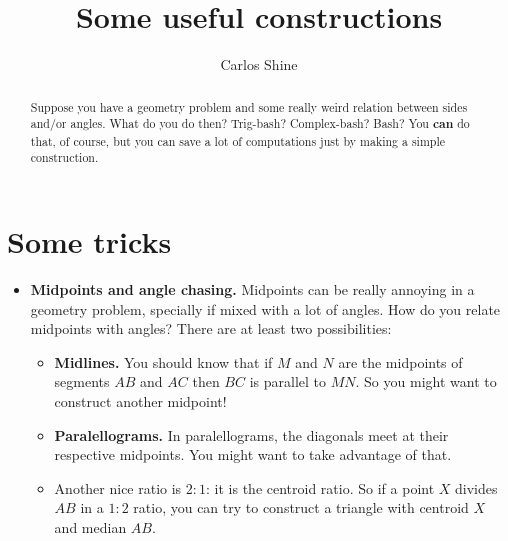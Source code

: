 \documentclass[10pt]{article}
\theoremstyle{definition}
\theoremstyle{remark}
\begin{document}
\title{Some useful constructions}
\author{Carlos Shine}
\date{}
\maketitle
\begin{abstract}
Suppose you have a geometry problem and some really weird relation between sides and/or angles. What do you do then? Trig-bash? Complex-bash? Bash? You \textbf{can} do that, of course, but you can save a lot of computations just by making a simple construction.
\end{abstract}

\section{Some tricks}
\begin{itemize}
\item \textbf{Midpoints and angle chasing.} Midpoints can be really annoying in a geometry problem, specially if mixed with a lot of angles. How do you relate midpoints with angles? There are at least two possibilities:
\begin{itemize}
\item \textbf{Midlines.} You should know that if $M$ and $N$ are the midpoints of segments $AB$ and $AC$ then $BC$ is parallel to $MN$. So you might want to construct another midpoint!
\item \textbf{Paralellograms.} In paralellograms, the diagonals meet at their respective midpoints. You might want to take advantage of that.
\item Another nice ratio is $2:1$: it is the centroid ratio. So if a point $X$ divides $AB$ in a $1:2$ ratio, you can try to construct a triangle with centroid $X$ and median $AB$.
\end{itemize}


\end{itemize}
\end{document}
